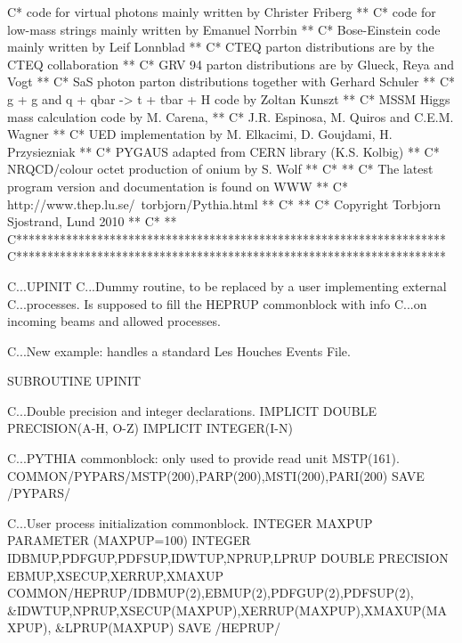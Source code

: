 C*    code for virtual photons mainly written by Christer Friberg   **
C*    code for low-mass strings mainly written by Emanuel Norrbin   **
C*        Bose-Einstein code mainly written by Leif Lonnblad        **
C*      CTEQ  parton distributions are by the CTEQ collaboration    **
C*      GRV 94 parton distributions are by Glueck, Reya and Vogt    **
C*   SaS photon parton distributions together with Gerhard Schuler  **
C*     g + g and q + qbar -> t + tbar + H code by Zoltan Kunszt     **
C*         MSSM Higgs mass calculation code by M. Carena,           **
C*           J.R. Espinosa, M. Quiros and C.E.M. Wagner             **
C*  UED implementation by M. Elkacimi, D. Goujdami, H. Przysiezniak **
C*         PYGAUS adapted from CERN library (K.S. Kolbig)           **
C*        NRQCD/colour octet production of onium by S. Wolf         **
C*                                                                  **
C*   The latest program version and documentation is found on WWW   **
C*            http://www.thep.lu.se/~torbjorn/Pythia.html           **
C*                                                                  **
C*              Copyright Torbjorn Sjostrand, Lund 2010             **
C*                                                                  **
C*********************************************************************
C*********************************************************************

C...UPINIT
C...Dummy routine, to be replaced by a user implementing external
C...processes. Is supposed to fill the HEPRUP commonblock with info
C...on incoming beams and allowed processes.

C...New example: handles a standard Les Houches Events File.

      SUBROUTINE UPINIT

C...Double precision and integer declarations.
      IMPLICIT DOUBLE PRECISION(A-H, O-Z)
      IMPLICIT INTEGER(I-N)

C...PYTHIA commonblock: only used to provide read unit MSTP(161).
      COMMON/PYPARS/MSTP(200),PARP(200),MSTI(200),PARI(200)
      SAVE /PYPARS/

C...User process initialization commonblock.
      INTEGER MAXPUP
      PARAMETER (MAXPUP=100)
      INTEGER IDBMUP,PDFGUP,PDFSUP,IDWTUP,NPRUP,LPRUP
      DOUBLE PRECISION EBMUP,XSECUP,XERRUP,XMAXUP
      COMMON/HEPRUP/IDBMUP(2),EBMUP(2),PDFGUP(2),PDFSUP(2),
     &IDWTUP,NPRUP,XSECUP(MAXPUP),XERRUP(MAXPUP),XMAXUP(MAXPUP),
     &LPRUP(MAXPUP)
      SAVE /HEPRUP/

